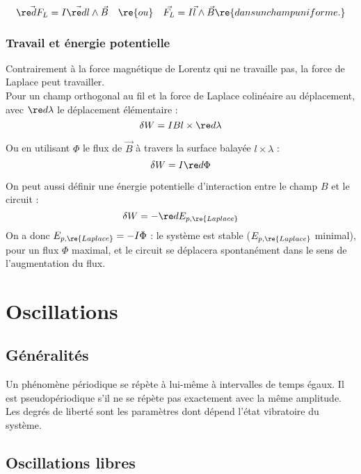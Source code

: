 \documentclass[13pt, twoside, a4paper, french]{report}
\begin{document}
            \[\vec{\re dF_L} = I \vec{\re dl} \wedge \vec B \quad \re{ou} \quad \vec{F_L} = I \vec l \wedge \vec B \re{ dans un champ uniforme.}\]

        \subsection{Travail et énergie potentielle}

            Contrairement à la force magnétique de Lorentz qui ne travaille pas, la force de Laplace peut travailler.\\
            Pour un champ orthogonal au fil et la force de Laplace colinéaire au déplacement, avec $\re d \lambda$ le déplacement élémentaire :
            \[\delta W = I B l \times \re d \lambda\]

            Ou en utilisant $\Phi$ le flux de $\vec B$ à travers la surface balayée $l \times \lambda$ :
            \[\delta W = I \re d \Phi\]

            On peut aussi définir une énergie potentielle d’interaction entre le champ $B$ et le circuit :
            \[\delta W = - \re d E_{p,\re{Laplace}}\]
            On a donc $E_{p,\re{Laplace}} = - I \Phi$ : le système est stable ($E_{p,\re{Laplace}}$ minimal), pour un flux $\Phi$ maximal, et le circuit se déplacera spontanément dans le sens de l’augmentation du flux.


\chapter{Oscillations}


    \section{Généralités}

        Un phénomène périodique se répète à lui-même à intervalles de temps égaux.
        Il est pseudopériodique s'il ne se répète pas exactement avec la même amplitude.\\
        Les degrés de liberté sont les paramètres dont dépend l’état vibratoire du système.\\


    \section{Oscillations libres}
\end{document}
